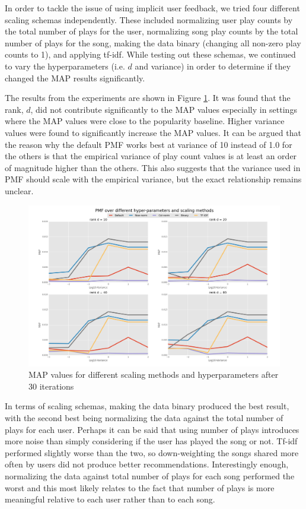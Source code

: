 \documentclass[11pt,preprint]{aastex}
\begin{document}
In order to tackle the issue of using implicit user feedback, we tried four different scaling schemas independently. These included normalizing user play counts by the total number of plays for the user, normalizing song play counts by the total number of plays for the song, making the data binary (changing all non-zero play counts to 1), and applying tf-idf. While testing out these schemas, we continued to vary the hyperparameters (i.e. $d$ and variance) in order to determine if they changed the MAP results significantly. 
 
The results from the experiments are shown in Figure \ref{fig:PMF}. It was found that the rank, $d$, did not contribute significantly to the MAP values especially in settings where the MAP values were close to the popularity baseline. Higher variance values were found to significantly increase the MAP values. It can be argued that the reason why the default PMF works best at variance of 10 instead of 1.0 for the others is that the empirical variance of play count values is at least an order of magnitude higher than the others. This also suggests that the variance used in PMF should scale with the empirical variance, but the exact relationship remains unclear.

\begin{figure}[htbp] %
   \centering
   \includegraphics[width=6in]{../plots/final/PMF.png} 
   \caption{MAP values for different scaling methods and hyperparameters after 30 iterations}
   \label{fig:PMF}
\end{figure}

In terms of scaling schemas, making the data binary produced the best result, with the second best being normalizing the data against the total number of plays for each user. Perhaps it can be said that using number of plays introduces more noise than simply considering if the user has played the song or not. Tf-idf performed slightly worse than the two, so down-weighting the songs shared more often by users did not produce better recommendations. Interestingly enough, normalizing the data against total number of plays for each song performed the worst and this most likely relates to the fact that number of plays is more meaningful relative to each user rather than to each song. 
 
\end{document}
